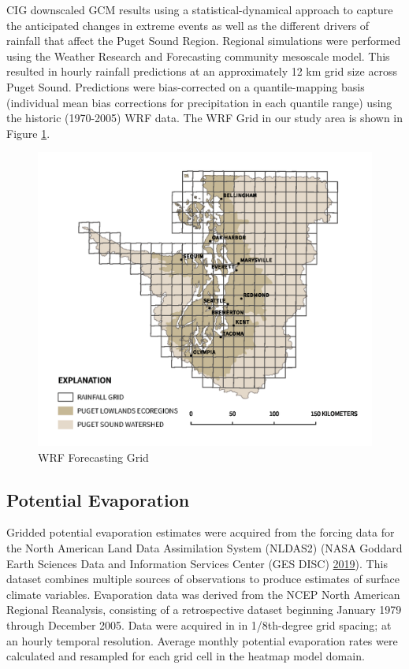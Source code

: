 \documentclass[
]{report}
\begin{document}
CIG downscaled GCM results using a statistical-dynamical approach to capture the anticipated changes in extreme events as well as the different drivers of rainfall that affect the Puget Sound Region. Regional simulations were performed using the Weather Research and Forecasting community mesoscale model. This resulted in hourly rainfall predictions at an approximately 12 km grid size across Puget Sound. Predictions were bias-corrected on a quantile-mapping basis (individual mean bias corrections for precipitation in each quantile range) using the historic (1970-2005) WRF data. The WRF Grid in our study area is shown in Figure \ref{fig:wrfGrid}.

\begin{figure}[H]
\includegraphics[width=17.28in]{qgis/for_figure} \caption{WRF Forecasting Grid}\label{fig:wrfGrid}
\end{figure}

\hypertarget{potential-evaporation}{%
\subsection{Potential Evaporation}\label{potential-evaporation}}

Gridded potential evaporation estimates were acquired from the forcing data for the North American Land Data Assimilation System (NLDAS2) (NASA Goddard Earth Sciences Data and Information Services Center (GES DISC) \protect\hyperlink{ref-NASAGoddardEarthSciencesDataandInformationServicesCenterGESDISC2019}{2019}). This dataset combines multiple sources of observations to produce estimates of surface climate variables. Evaporation data was derived from the NCEP North American Regional Reanalysis, consisting of a retrospective dataset beginning January 1979 through December 2005. Data were acquired in in 1/8th-degree grid spacing; at an hourly temporal resolution. Average monthly potential evaporation rates were calculated and resampled for each grid cell in the heatmap model domain.
\end{document}
